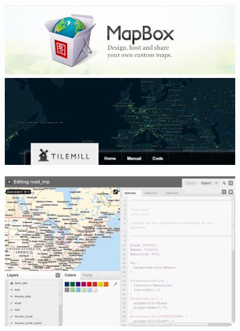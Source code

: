 \begin{frame}
\begin{center}
\includegraphics[width=4in]{tools/mapnik/mapbox.jpg}\\

\includegraphics[width=4in]{tools/mapnik/tilemill.jpg}
\end{center}
\end{frame}


\begin{frame}
\begin{center}
\includegraphics[width=4in]{tools/mapnik/tilemill-ss.png}
\end{center}
\end{frame}